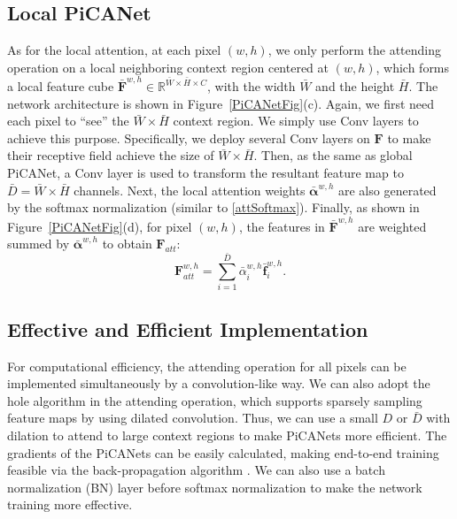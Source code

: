 \documentclass[10pt,twocolumn,letterpaper]{article}
\begin{document}
\subsection{Local PiCANet}

As for the local attention, at each pixel $(w,h)$, we only perform the attending operation on a local neighboring context region centered at $(w,h)$, which forms a local feature cube $\bar{\bm{F}}^{w,h}\in{\mathbb{R}^{\bar{W}\times{\bar{H}\times C}}}$, with the width $\bar{W}$ and the height $\bar{H}$. The network architecture is shown in Figure~\ref{PiCANetFig}(c). Again, we first need each pixel to ``see'' the $\bar{W}\times\bar{H}$ context region. We simply use Conv layers to achieve this purpose. Specifically, we deploy several Conv layers on $\bm{F}$ to make their receptive field achieve the size of $\bar{W}\times\bar{H}$. Then, as the same as global PiCANet, a Conv layer is used to transform the resultant feature map to $\bar{D}=\bar{W}\times\bar{H}$ channels. Next, the local attention weights $\bar{\bm{\alpha}}^{w,h}$ are also generated by the softmax normalization (similar to \eqref{attSoftmax}). Finally, as shown in Figure~\ref{PiCANetFig}(d), for pixel $(w,h)$, the features in $\bar{\bm{F}}^{w,h}$ are weighted summed by $\bar{\bm{\alpha}}^{w,h}$ to obtain $\bm{F}_{att}$:
\begin{equation} \label{localAtt}
\bm{F}_{att}^{w,h}=\sum_{i=1}^{\bar{D}}{{\bar{\alpha}}_i^{w,h}\bar{\bm{f}}_{i}^{w,h}}.
\end{equation}

\subsection{Effective and Efficient Implementation}

For computational efficiency, the attending operation for all pixels can be implemented simultaneously by a convolution-like way. We can also adopt the hole algorithm \cite{chen2016deeplab} in the attending operation, which supports sparsely sampling feature maps by using dilated convolution. Thus, we can use a small $D$ or $\bar{D}$ with dilation to attend to large context regions to make PiCANets more efficient. The gradients of the PiCANets can be easily calculated, making end-to-end training feasible via the back-propagation algorithm \cite{rumelhart1988bp}. We can also use a batch normalization (BN) \cite{ioffe2015bn} layer before softmax normalization to make the network training more effective.
\end{document}
